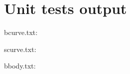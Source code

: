 \begin{scriptsize}
\begin{ttfamily}

\end{ttfamily}
\end{scriptsize}

\section{Unit tests output}

\begin{scriptsize}
\begin{ttfamily}

\end{ttfamily}
\end{scriptsize}

bcurve.txt:\\

\begin{scriptsize}
\begin{ttfamily}

\end{ttfamily}
\end{scriptsize}

scurve.txt:\\

\begin{scriptsize}
\begin{ttfamily}

\end{ttfamily}
\end{scriptsize}

bbody.txt:\\

\begin{scriptsize}
\begin{ttfamily}

\end{ttfamily}
\end{scriptsize}

